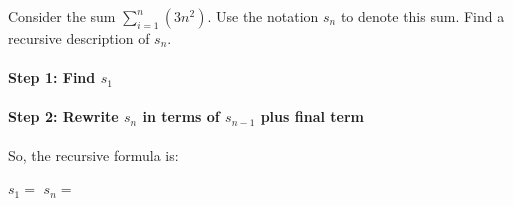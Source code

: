 \documentclass[a4paper,12pt]{book}
\newcounter{question}
\begin{document}
        \newpage
        \begin{questionNOGRADE}{\thequestion}

            Consider the sum $\sum_{i=1}^{n} (3n^{2})$. Use the notation
            $s_{n}$ to denote this sum. Find a recursive description of $s_{n}$.

            \paragraph{Step 1: Find $s_{1}$}


            \paragraph{Step 2: Rewrite $s_{n}$ in terms of $s_{n-1}$ plus final term}
            

            So, the recursive formula is:

            \begin{framed}
                $s_{1} = $ 
                \tab[4cm]
                $s_{n} = $ 
            \end{framed}
            
        \end{questionNOGRADE}

        \hrulefill
\end{document}

